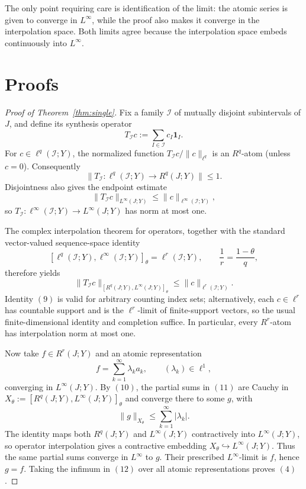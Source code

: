 \documentclass[10pt]{article}
\newcommand{\cI}{\mathcal I}
\newcommand{\1}{\mathbf 1}
\begin{document}
The only point requiring care is identification of the limit: the atomic
series is given to converge in \(L^\infty\), while the proof also makes it
converge in the interpolation space.  Both limits agree because the
interpolation space embeds continuously into \(L^\infty\).

\section{Proofs}

\begin{proof}[Proof of Theorem~\ref{thm:single}]
Fix a family \(\cI\) of mutually disjoint subintervals of \(J\), and
define its synthesis operator
\[
 T_{\cI}c:=\sum_{I\in\cI}c_I\1_I.
 \tag{6}
\]
For \(c\in\ell^q(\cI;Y)\), the normalized function
\(T_{\cI}c/\|c\|_{\ell^q}\) is an \(R^q\)-atom (unless \(c=0\)).
Consequently
\[
 \|T_{\cI}:\ell^q(\cI;Y)\to R^q(J;Y)\|\leq1.
 \tag{7}
\]
Disjointness also gives the endpoint estimate
\[
 \|T_{\cI}c\|_{L^\infty(J;Y)}
 \leq \|c\|_{\ell^\infty(\cI;Y)},
 \tag{8}
\]
so \(T_{\cI}:\ell^\infty(\cI;Y)\to L^\infty(J;Y)\) has norm at most
one.

The complex interpolation theorem for operators, together with the
standard vector-valued sequence-space identity
\[
 [\ell^q(\cI;Y),\ell^\infty(\cI;Y)]_\theta
 =\ell^r(\cI;Y),
 \qquad \frac1r=\frac{1-\theta}{q},
 \tag{9}
\]
therefore yields
\[
 \|T_{\cI}c\|_{[R^q(J;Y),L^\infty(J;Y)]_\theta}
 \leq \|c\|_{\ell^r(\cI;Y)}.
 \tag{10}
\]
Identity \((9)\) is valid for arbitrary counting index sets; alternatively,
each \(c\in\ell^r\) has countable support and is the \(\ell^r\)-limit of
finite-support vectors, so the usual finite-dimensional identity and
completion suffice.  In particular, every \(R^r\)-atom has interpolation
norm at most one.

Now take \(f\in R^r(J;Y)\) and an atomic representation
\[
 f=\sum_{k=1}^\infty\lambda_k a_k,
 \qquad (\lambda_k)\in\ell^1,
 \tag{11}
\]
converging in \(L^\infty(J;Y)\).  By \((10)\), the partial sums in
\((11)\) are Cauchy in
\(X_\theta:=[R^q(J;Y),L^\infty(J;Y)]_\theta\) and converge there to some
\(g\), with
\[
 \|g\|_{X_\theta}\leq\sum_{k=1}^\infty|\lambda_k|.
 \tag{12}
\]
The identity maps both \(R^q(J;Y)\) and \(L^\infty(J;Y)\) contractively
into \(L^\infty(J;Y)\), so operator interpolation gives a contractive
embedding \(X_\theta\hookrightarrow L^\infty(J;Y)\).  Thus the same
partial sums converge in \(L^\infty\) to \(g\).  Their prescribed
\(L^\infty\)-limit is \(f\), hence \(g=f\).  Taking the infimum in
\((12)\) over all atomic representations proves \((4)\).
\end{proof}
\end{document}
